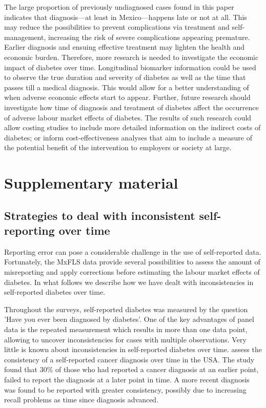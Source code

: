 \documentclass[12pt,english]{article}
\begin{document}
The large proportion of previously undiagnosed cases found in this paper indicates that diagnosis---at least in Mexico---happens late or not at all. This may reduce the possibilities to prevent complications via treatment and self-management, increasing the risk of severe complications appearing premature. Earlier diagnosis and ensuing effective treatment may lighten the health and economic burden. Therefore, more research is needed to investigate the economic impact of diabetes over time. Longitudinal biomarker information could be used to observe the true duration and severity of diabetes as well as the time that passes till a medical diagnosis. This would allow for a better understanding of when adverse economic effects start to appear. Further, future research should investigate how time of diagnosis and treatment of diabetes affect the occurrence of adverse labour market effects of diabetes. The results of such research could allow costing studies to include more detailed information on the indirect costs of diabetes; or inform cost-effectiveness analyses that aim to include a measure of the potential benefit of the intervention to employers or society at large. 

\printbibliography


\clearpage
\setcounter{table}{0}
\renewcommand{\thetable}{S\arabic{table}}
\setcounter{figure}{0}
\setcounter{page}{1}
\renewcommand{\thefigure}{S\arabic{figure}} %
\section*{Supplementary material}

\subsection*{\label{sec:Appendix}Strategies to deal with inconsistent self-reporting over time}

Reporting error can pose a considerable challenge in the use of self-reported data. Fortunately, the \ac{MxFLS} data provide several possibilities to assess the amount of misreporting and apply corrections before estimating the labour market effects of diabetes. In what follows we describe how we have dealt with inconsistencies in self-reported diabetes over time.

Throughout the surveys, self-reported diabetes was measured by the question 'Have you ever been diagnosed by diabetes'. One of the key advantages of panel data is the repeated measurement which results in more than one data point, allowing to uncover inconsistencies for cases with multiple observations. Very little is known about inconsistencies in self-reported diabetes over time. \textcite{Zajacova2010} assess the consistency of a self-reported cancer diagnosis over time in the USA. The study found that 30\% of those who had reported a cancer diagnosis at an earlier point, failed to report the diagnosis at a later point in time. A more recent diagnosis was found to be reported with greater consistency, possibly due to increasing recall problems as time since diagnosis advanced.
\end{document}
